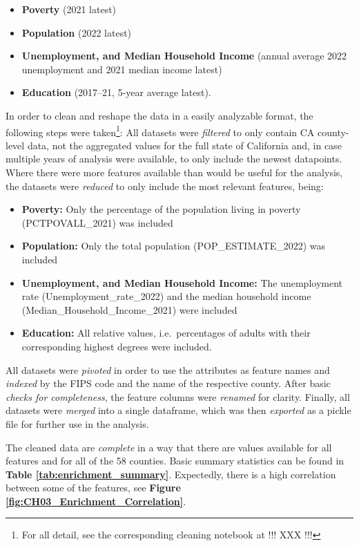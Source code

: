 \begin{itemize}
    \item \textbf{Poverty} (2021 latest)
    \item \textbf{Population} (2022 latest)
    \item \textbf{Unemployment, and Median Household Income} (annual average 2022 unemployment and 2021 median income latest)
    \item \textbf{Education} (2017–21, 5-year average latest).
\end{itemize}

In order to clean and reshape the data in a easily analyzable format, the following steps were taken\footnote{For all detail, see the corresponding cleaning notebook at !!! XXX !!!}:
All datasets were \textit{filtered} to only contain CA county-level data, not the aggregated values for the full state of California and, in case multiple years of analysis were available, to only include the newest datapoints. 
Where there were more features available than would be useful for the analysis, the datasets were \textit{reduced} to only include the most relevant features, being:

\begin{itemize}
    \item \textbf{Poverty:} Only the percentage of the population living in poverty (PCTPOVALL\_2021) was included
    \item \textbf{Population:} Only the total population (POP\_ESTIMATE\_2022) was included
    \item \textbf{Unemployment, and Median Household Income:} The unemployment rate (Unemployment\_rate\_2022) and the median household income (Median\_Household\_Income\_2021) were included
    \item \textbf{Education:} All relative values, i.e.\ percentages of adults with their corresponding highest degrees were included.
\end{itemize}

All datasets were \textit{pivoted} in order to use the attributes as feature names and \textit{indexed} by the FIPS code and the name of the respective county. After basic \textit{checks for completeness}, the feature columns were \textit{renamed} for clarity. Finally, all datasets were \textit{merged} into a single dataframe, which was then \textit{exported} as a pickle file for further use in the analysis.


The cleaned data are \textit{complete} in a way that there are values available for all features and for all of the 58 counties. Basic summary statistics can be found in \textbf{Table \ref{tab:enrichment_summary}}. Expectedly, there is a high correlation between some of the features, see \textbf{Figure \ref{fig:CH03_Enrichment_Correlation}}.

